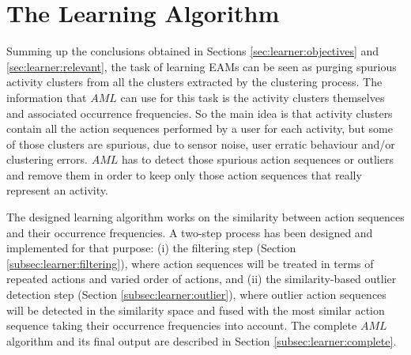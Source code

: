 \section{The Learning Algorithm}
\label{sec:learner:algorithm}






Summing up the conclusions obtained in Sections \ref{sec:learner:objectives} and \ref{sec:learner:relevant}, the task of learning EAMs can be seen as purging spurious activity clusters from all the clusters extracted by the clustering process. The information that $AML$ can use for this task is the activity clusters themselves and associated occurrence frequencies. So the main idea is that activity clusters contain all the action sequences performed by a user for each activity, but some of those clusters are spurious, due to sensor noise, user erratic behaviour and/or clustering errors. $AML$ has to detect those spurious action sequences or outliers and remove them in order to keep only those action sequences that really represent an activity.

The designed learning algorithm works on the similarity between action sequences and their occurrence frequencies. A two-step process has been designed and implemented for that purpose: (i) the filtering step (Section \ref{subsec:learner:filtering}), where action sequences will be treated in terms of repeated actions and varied order of actions, and (ii) the similarity-based outlier detection step (Section \ref{subsec:learner:outlier}), where outlier action sequences will be detected in the similarity space and fused with the most similar action sequence taking their occurrence frequencies into account. The complete $AML$ algorithm and its final output are described in Section \ref{subsec:learner:complete}.

